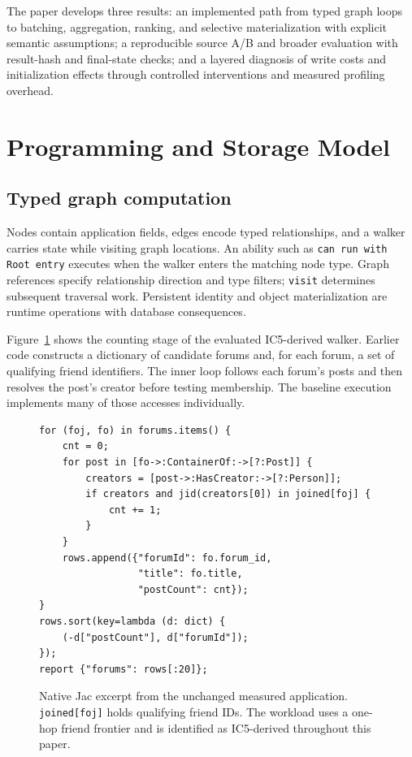 \documentclass[sigconf,nonacm]{acmart}
\newcommand{\code}[1]{\texttt{#1}}
\begin{document}
The paper develops three results: an implemented path from typed graph loops
to batching, aggregation, ranking, and selective materialization with explicit
semantic assumptions; a reproducible source A/B and broader evaluation with
result-hash and final-state checks; and a layered diagnosis of write costs and
initialization effects through controlled interventions and measured profiling
overhead.

\section{Programming and Storage Model}
\label{sec:model}

\subsection{Typed graph computation}
Nodes contain application fields, edges encode typed relationships, and a
walker carries state while visiting graph locations. An ability such as
\code{can run with Root entry} executes when the walker enters the matching
node type. Graph references specify relationship direction and type filters;
\code{visit} determines subsequent traversal work. Persistent identity and
object materialization are runtime operations with database consequences.

Figure~\ref{fig:source} shows the counting stage of the evaluated
IC5-derived walker. Earlier code constructs a dictionary of candidate forums
and, for each forum, a set of qualifying friend identifiers. The inner loop
follows each forum's posts and then resolves the post's creator before testing
membership. The baseline execution implements many of those accesses
individually.

\begin{figure}[t]
\begin{lstlisting}[language=Jac]
for (foj, fo) in forums.items() {
    cnt = 0;
    for post in [fo->:ContainerOf:->[?:Post]] {
        creators = [post->:HasCreator:->[?:Person]];
        if creators and jid(creators[0]) in joined[foj] {
            cnt += 1;
        }
    }
    rows.append({"forumId": fo.forum_id,
                 "title": fo.title,
                 "postCount": cnt});
}
rows.sort(key=lambda (d: dict) {
    (-d["postCount"], d["forumId"]);
});
report {"forums": rows[:20]};
\end{lstlisting}
\caption{Native Jac excerpt from the unchanged measured application.
\code{joined[foj]} holds qualifying friend IDs. The workload uses a one-hop
friend frontier and is identified as IC5-derived throughout this paper.}
\label{fig:source}
\end{figure}
\end{document}
